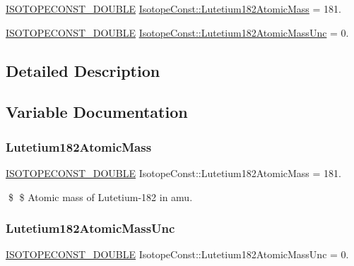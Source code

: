 \begin{DoxyCompactItemize}
\item 
\mbox{\hyperlink{group___isotope_const-_macros_ga8f45a7272ce02c0b4c65c44636ed719a}{I\+S\+O\+T\+O\+P\+E\+C\+O\+N\+S\+T\+\_\+\+D\+O\+U\+B\+LE}} \mbox{\hyperlink{group___isotope_const-_lutetium-_lu182_ga0f2a1eb29044a2c538542bddaea2d362}{Isotope\+Const\+::\+Lutetium182\+Atomic\+Mass}} = 181.
\item 
\mbox{\hyperlink{group___isotope_const-_macros_ga8f45a7272ce02c0b4c65c44636ed719a}{I\+S\+O\+T\+O\+P\+E\+C\+O\+N\+S\+T\+\_\+\+D\+O\+U\+B\+LE}} \mbox{\hyperlink{group___isotope_const-_lutetium-_lu182_gaa3838ca2c5df638dad4510a151ebb26a}{Isotope\+Const\+::\+Lutetium182\+Atomic\+Mass\+Unc}} = 0.
\end{DoxyCompactItemize}


\subsection{Detailed Description}


\subsection{Variable Documentation}
\mbox{\label{group___isotope_const-_lutetium-_lu182_ga0f2a1eb29044a2c538542bddaea2d362}} 
\subsubsection{\texorpdfstring{Lutetium182\+Atomic\+Mass}{Lutetium182AtomicMass}}
{\footnotesize\ttfamily \mbox{\hyperlink{group___isotope_const-_macros_ga8f45a7272ce02c0b4c65c44636ed719a}{I\+S\+O\+T\+O\+P\+E\+C\+O\+N\+S\+T\+\_\+\+D\+O\+U\+B\+LE}} Isotope\+Const\+::\+Lutetium182\+Atomic\+Mass = 181.}

\$ \$ Atomic mass of Lutetium-\/182 in amu. \mbox{\label{group___isotope_const-_lutetium-_lu182_gaa3838ca2c5df638dad4510a151ebb26a}} 
\subsubsection{\texorpdfstring{Lutetium182\+Atomic\+Mass\+Unc}{Lutetium182AtomicMassUnc}}
{\footnotesize\ttfamily \mbox{\hyperlink{group___isotope_const-_macros_ga8f45a7272ce02c0b4c65c44636ed719a}{I\+S\+O\+T\+O\+P\+E\+C\+O\+N\+S\+T\+\_\+\+D\+O\+U\+B\+LE}} Isotope\+Const\+::\+Lutetium182\+Atomic\+Mass\+Unc = 0.}

